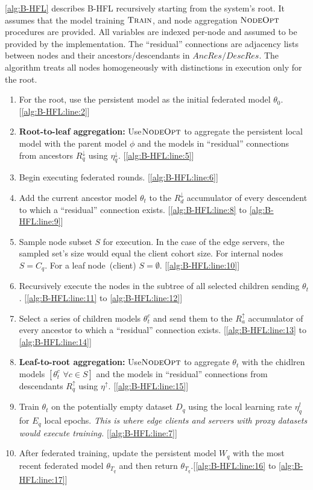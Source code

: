 \cref{alg:B-HFL} describes B-HFL recursively starting from the system's root. It assumes that the model training $\textsc{Train}$, and node aggregation $\textsc{NodeOpt}$ procedures are provided. All variables are indexed per-node and assumed to be provided by the implementation. The ``residual'' connections are adjacency lists between nodes and their ancestors/descendants in $AncRes/DescRes$. The algorithm treats all nodes homogeneously with distinctions in execution only for the root.
\begin{enumerate}
    \item For the root, use the persistent model as the initial federated model $\theta_0$.  [\cref{alg:B-HFL:line:2}]

    \item \textbf{Root-to-leaf aggregation:} Use$\textsc{NodeOpt}$ to aggregate the persistent local model with the parent model $\phi$ and the models in ``residual'' connections from ancestors $R^\downarrow_q$ using $\eta^\downarrow_q$. [\cref{alg:B-HFL:line:5}]
    \item Begin executing federated rounds. [\cref{alg:B-HFL:line:6}]

    \item Add the current ancestor model $\theta_t$ to the $R^\downarrow_d$ accumulator of every descendent to which a ``residual'' connection exists. [\cref{alg:B-HFL:line:8} to \cref{alg:B-HFL:line:9}]
    \item Sample node subset $S$ for execution. In the case of the edge servers, the sampled set's size would equal the client cohort size. For internal nodes $S = C_q$. For a leaf node~(client) $S = \emptyset$. [\cref{alg:B-HFL:line:10}]
    \item Recursively execute the nodes in the subtree of all selected children sending $\theta_t$.  [\cref{alg:B-HFL:line:11} to \cref{alg:B-HFL:line:12}]
    \item Select a series of children models $\theta_t^c$ and send them to the $R^\uparrow_a$ accumulator of every ancestor to which a ``residual'' connection exists. [\cref{alg:B-HFL:line:13} to \cref{alg:B-HFL:line:14}]
    \item \textbf{Leaf-to-root aggregation:} Use$\textsc{NodeOpt}$ to aggregate $\theta_t$ with the chidlren models $[\theta^c_t \,\, \forall c \in S]$ and the models in ``residual'' connections from descendants $R^\uparrow_q$ using $\eta^\uparrow$.  [\cref{alg:B-HFL:line:15}]
    \item Train $\theta_t$ on the potentially empty dataset $D_q$ using the local learning rate $\eta^l_q$ for $E_q$ local epochs. \textit{This is where edge clients and servers with proxy datasets would execute training.} [\cref{alg:B-HFL:line:7}]
    \item After federated training, update the persistent model $W_q$ with the most recent federated model $\theta_{T_q}$ and then return $\theta_{T_q}$.[\cref{alg:B-HFL:line:16} to \cref{alg:B-HFL:line:17}]


\end{enumerate}

